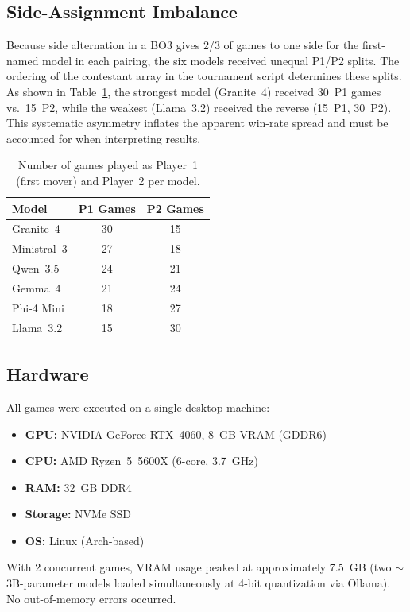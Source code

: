 \documentclass[11pt]{article}
\begin{document}
\subsection{Side-Assignment Imbalance}

Because side alternation in a BO3 gives 2/3 of games to one side for the first-named model in each pairing, the six models received unequal P1/P2 splits. The ordering of the contestant array in the tournament script determines these splits. As shown in Table~\ref{tab:side_split}, the strongest model (Granite~4) received 30~P1 games vs.\ 15~P2, while the weakest (Llama~3.2) received the reverse (15~P1, 30~P2). This systematic asymmetry inflates the apparent win-rate spread and must be accounted for when interpreting results.

\begin{table}[H]
\centering
\caption{Number of games played as Player~1 (first mover) and Player~2 per model.}
\label{tab:side_split}
\begin{tabular}{lcc}
\toprule
\textbf{Model} & \textbf{P1 Games} & \textbf{P2 Games} \\
\midrule
Granite~4   & 30 & 15 \\
Ministral~3 & 27 & 18 \\
Qwen~3.5    & 24 & 21 \\
Gemma~4     & 21 & 24 \\
Phi-4 Mini  & 18 & 27 \\
Llama~3.2   & 15 & 30 \\
\bottomrule
\end{tabular}
\end{table}

\subsection{Hardware}

All games were executed on a single desktop machine:
\begin{itemize}[nosep]
\item \textbf{GPU:} NVIDIA GeForce RTX~4060, 8~GB VRAM (GDDR6)
\item \textbf{CPU:} AMD Ryzen~5~5600X (6-core, 3.7~GHz)
\item \textbf{RAM:} 32~GB DDR4
\item \textbf{Storage:} NVMe SSD
\item \textbf{OS:} Linux (Arch-based)
\end{itemize}

With 2 concurrent games, VRAM usage peaked at approximately 7.5~GB (two $\sim$3B-parameter models loaded simultaneously at 4-bit quantization via Ollama). No out-of-memory errors occurred.
\end{document}
